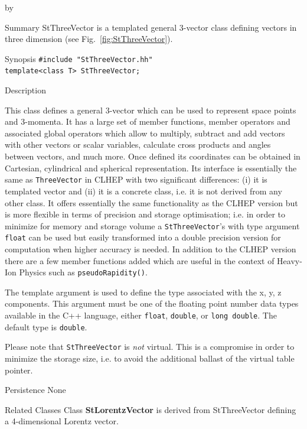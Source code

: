 \documentclass[twoside]{article}
\newcommand{\comp}[1]{\texttt{#1}}%
\newcommand{\entrylabel}[1]{\mbox{\textbf{{#1}}}\hfil}%
\newenvironment{entry}
{\begin{list}{}%
    {\renewcommand{\makelabel}{\entrylabel}%
     \setlength{\labelwidth}{90pt}%
     \setlength{\leftmargin}{\labelwidth}
     \advance\leftmargin by \labelsep%
      }%
    }%
  {\end{list}}
\newcommand{\Entrylabel}[1]%
{\raisebox{0pt}[1ex][0pt]{\makebox[\labelwidth][l]%
    {\parbox[t]{\labelwidth}{\hspace{0pt}\textbf{{#1}}}}}}
\newenvironment{Entry}%
{\renewcommand{\entrylabel}{\Entrylabel}\begin{entry}}%
  {\end{entry}}
\begin{document}
\begin{Entry}
\item[Summary]
    StThreeVector is a templated general 3-vector class defining
    vectors in three dimension (see Fig.~\ref{fig:StThreeVector}).

\item[Synopsis]
    \verb+#include "StThreeVector.hh"+ \\
    \verb+template<class T> StThreeVector;+
    
    
\item[Description]   
    
    This class defines a general 3-vector which can be used to
    represent space points and 3-momenta.  It has a large set of
    member functions, member operators and associated global operators
    which allow to multiply, subtract and add vectors with other
    vectors or scalar variables, calculate cross products and angles
    between vectors, and much more. Once defined its coordinates can
    be obtained in Cartesian, cylindrical and spherical
    representation.  Its interface is essentially the same as
    \comp{ThreeVector} in CLHEP  with two significant differences:
    (i) it is templated vector and (ii) it is a concrete class, i.e.
    it is not derived from any other class.  It offers essentially the
    same functionality as the CLHEP version but is more flexible in
    terms of precision and storage optimisation; i.e. in order to
    minimize for memory and storage volume a \comp{StThreeVector}'s
    with type argument \comp{float} can be used but easily
    transformed into a double precision version for computation when
    higher accuracy is needed.  In addition to the CLHEP version there
    are a few member functions added which are useful in the context
    of Heavy-Ion Physics such as \comp{pseudoRapidity()}.

    The template argument is used to define the type associated with
    the x, y, z components. This argument must be one of the floating
    point number data types available in the C++ language, either
    \comp{float}, \comp{double}, or \comp{long double}. The
    default type is \comp{double}.
    
    Please note that \comp{StThreeVector} is {\em not} virtual. This
    is a compromise in order to minimize the storage size, i.e. to
    avoid the additional ballast of the virtual table pointer.
\item[Persistence]
    None

\item[Related Classes]
    Class {\bf StLorentzVector} 
    is derived from StThreeVector
    defining a 4-dimensional Lorentz vector. 


\end{Entry}
\end{document}
